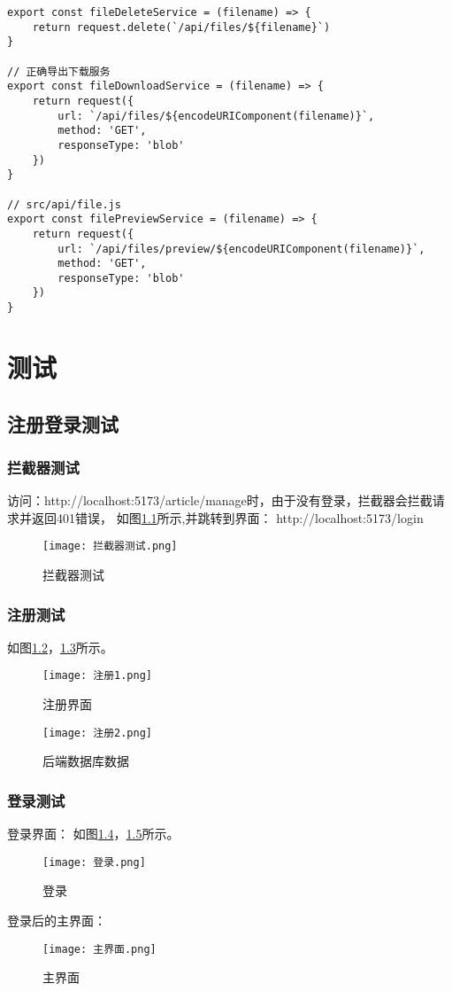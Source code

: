 \documentclass[bachelor]{thesis-uestc}
\begin{document}
\begin{itemize}
\begin{lstlisting}
export const fileDeleteService = (filename) => {
    return request.delete(`/api/files/${filename}`)
}

// 正确导出下载服务
export const fileDownloadService = (filename) => {
    return request({
        url: `/api/files/${encodeURIComponent(filename)}`,
        method: 'GET',
        responseType: 'blob'
    })
}

// src/api/file.js
export const filePreviewService = (filename) => {
    return request({
        url: `/api/files/preview/${encodeURIComponent(filename)}`,
        method: 'GET',
        responseType: 'blob'
    })
}
\end{lstlisting}
\end{itemize}

\chapter{测试}
\section{注册登录测试}
\subsection{拦截器测试}
访问：http://localhost:5173/article/manage时，由于没有登录，拦截器会拦截请求并返回401错误，
如图\ref{l1}所示,并跳转到界面：
http://localhost:5173/login
\begin{figure}[htbp]
    \centering
    \texttt{[image: 拦截器测试.png]}
    \caption{拦截器测试}
    \label{l1}
\end{figure}
\subsection{注册测试}
如图\ref{rc1}，\ref{rc2}所示。
\begin{figure}[htbp]
    \centering
    \texttt{[image: 注册1.png]}
    \caption{注册界面}
    \label{rc1}
\end{figure}
\begin{figure}[htbp]
    \centering
    \texttt{[image: 注册2.png]}
    \caption{后端数据库数据}
    \label{rc2}
\end{figure}
\subsection{登录测试}
登录界面：
如图\ref{dc2}，\ref{dc3}所示。
\begin{figure}[htbp]
    \centering
    \texttt{[image: 登录.png]}
    \caption{登录}
    \label{dc2}
\end{figure}
登录后的主界面：
\begin{figure}[htbp]
    \centering
    \texttt{[image: 主界面.png]}
    \caption{主界面}
    \label{dc3}
\end{figure}
\end{document}
